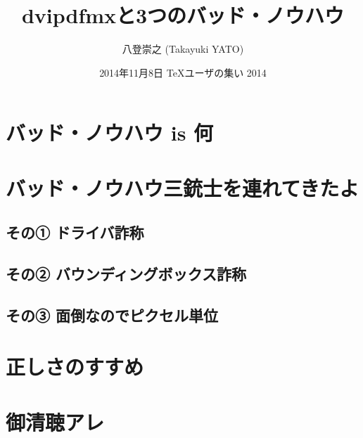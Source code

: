 \documentclass[xetex,14pt]{beamer}
\title{dvipdfmxと3つのバッド・ノウハウ}
\author[八登崇之]{八登崇之 (Takayuki YATO)}
\date{2014年11月8日 {\TeX}ユーザの集い 2014}
\begin{document}

\section{バッド・ノウハウ is 何}

\section{バッド・ノウハウ三銃士を連れてきたよ}

\subsection{その① ドライバ詐称}

\subsection{その② バウンディングボックス詐称}

\subsection{その③ 面倒なのでピクセル単位}

\section{正しさのすすめ}

\section{御清聴アレ}

\end{document}
